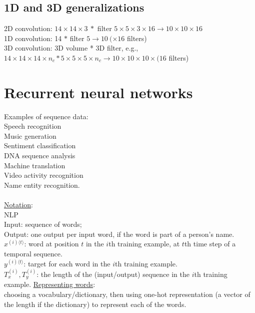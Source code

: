%
\subsection{1D and 3D generalizations}
2D convolution: $14 \times 14 \times 3 ~ * $ filter $5 \times 5 \times 3 \times 16 \rightarrow 10 \times 10 \times 16$\\
1D convolution: 14 $*$ filter $5 \rightarrow 10 ~ (\times 16$ filters)\\
3D convolution: 3D volume * 3D filter, e.g., $14 \times 14 \times 14 \times n_c * 5 \times 5 \times 5\times n_c \rightarrow 10 \times 10 \times 10 \times (16 $ filters)


\section{Recurrent neural networks}
Examples of sequence data:\\
Speech recognition\\
Music generation\\
Sentiment classification\\
DNA sequence analysis\\
Machine translation\\
Video activity recognition\\
Name entity recognition.\\
\\
\underline{Notation}:\\
NLP\\
Input: sequence of words;\\
Output: one output per input word, if the word is part of a person's name.\\
$x^{(i)\langle t \rangle}$: word at position $t$ in the $i$th training example, at $t$th time step of a temporal sequence.\\
$y^{(i)\langle t \rangle}$: target for each word in the $i$th training example.\\
$T^{(i)}_x, T^{(i)}_y$: the length of the (input/output) sequence in the $i$th training example.
\underline{Representing words}:\\
choosing a vocabulary/dictionary, then using one-hot representation (a vector of the length if the dictionary) to represent each of the words.

%
